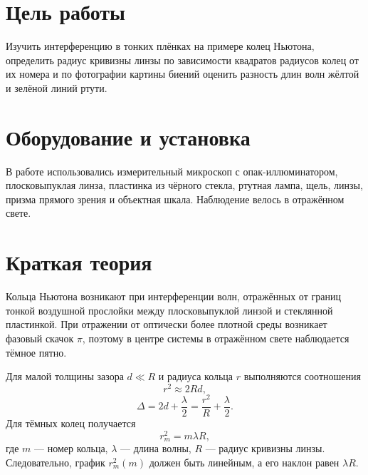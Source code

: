 \documentclass[twoside]{mfitjournal}
\begin{document}
\author{Евгений Иванов}

\makeatletter
\renewcommand{\tit}{}
\renewcommand{\@oddhead}{}
\renewcommand{\@evenhead}{}
\makeatother

\pagestyle{fancy}
\fancyhf{}

\maketitle

\section*{Цель работы}

Изучить интерференцию в тонких плёнках на примере колец Ньютона, определить радиус кривизны линзы по зависимости квадратов радиусов колец от их номера и по фотографии картины биений оценить разность длин волн жёлтой и зелёной линий ртути.

\section*{Оборудование и установка}

В работе использовались измерительный микроскоп с опак-иллюминатором, плосковыпуклая линза, пластинка из чёрного стекла, ртутная лампа, щель, линзы, призма прямого зрения и объектная шкала. Наблюдение велось в отражённом свете.

\section*{Краткая теория}

Кольца Ньютона возникают при интерференции волн, отражённых от границ тонкой воздушной прослойки между плосковыпуклой линзой и стеклянной пластинкой. При отражении от оптически более плотной среды возникает фазовый скачок $\pi$, поэтому в центре системы в отражённом свете наблюдается тёмное пятно.

Для малой толщины зазора $d \ll R$ и радиуса кольца $r$ выполняются соотношения
\begin{equation}
r^2 \approx 2Rd,
\end{equation}
\begin{equation}
\Delta = 2d + \frac{\lambda}{2} = \frac{r^2}{R} + \frac{\lambda}{2}.
\end{equation}
Для тёмных колец получается
\begin{equation}
r_m^2 = m \lambda R,
\end{equation}
где $m$ --- номер кольца, $\lambda$ --- длина волны, $R$ --- радиус кривизны линзы. Следовательно, график $r_m^2(m)$ должен быть линейным, а его наклон равен $\lambda R$.
\end{document}

